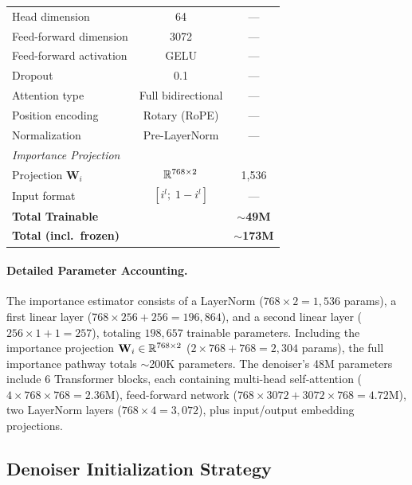 \begin{table}[H]
\begin{tabular}{lcc}
Head dimension & 64 & --- \\
Feed-forward dimension & 3072 & --- \\
Feed-forward activation & GELU & --- \\
Dropout & 0.1 & --- \\
Attention type & Full bidirectional & --- \\
Position encoding & Rotary (RoPE) & --- \\
Normalization & Pre-LayerNorm & --- \\
\midrule
\multicolumn{3}{l}{\textit{Importance Projection}} \\
Projection $\mathbf{W}_i$ & $\mathbb{R}^{768 \times 2}$ & 1,536 \\
Input format & $[i^l;\; 1{-}i^l]$ & --- \\
\midrule
\textbf{Total Trainable} & & \textbf{$\sim$49M} \\
\textbf{Total (incl.\ frozen)} & & \textbf{$\sim$173M} \\
\bottomrule
\end{tabular}
\end{table}

\paragraph{Detailed Parameter Accounting.} The importance estimator consists of a LayerNorm ($768 \times 2 = 1{,}536$ params), a first linear layer ($768 \times 256 + 256 = 196{,}864$), and a second linear layer ($256 \times 1 + 1 = 257$), totaling $198{,}657$ trainable parameters. Including the importance projection $\mathbf{W}_i \in \mathbb{R}^{768 \times 2}$ ($2 \times 768 + 768 = 2{,}304$ params), the full importance pathway totals $\sim$200K parameters. The denoiser's 48M parameters include 6 Transformer blocks, each containing multi-head self-attention ($4 \times 768 \times 768 = 2.36$M), feed-forward network ($768 \times 3072 + 3072 \times 768 = 4.72$M), two LayerNorm layers ($768 \times 4 = 3{,}072$), plus input/output embedding projections.

\subsection{Denoiser Initialization Strategy}

